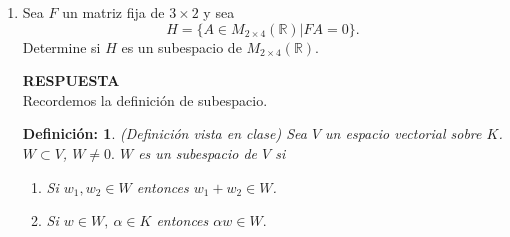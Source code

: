 \documentclass[11pt,letterpaper]{article}
\newcommand{\res}{\textbf{RESPUESTA}\\}
\newtheorem{thmd}{Definición:}
\begin{document}
\begin{enumerate}
\begin{align*}
A=\begin{pmatrix}
B & C \\
0 & E
\end{pmatrix}
\end{align*}
con $B$ y $E$ no singulares. Demuestre que $A^{-1}$ es de la forma
\begin{align*}
\begin{pmatrix}
B^{-1}& X \\
0 & E^{-1}
\end{pmatrix}
\end{align*}
y encuentre $X$. Luego, si 
\begin{align*}
A_1=\begin{pmatrix}
B & 0 \\
D & E
\end{pmatrix}
\end{align*}
y encuentre $Y$.

\res
Como ya demostramos que $A^{-1}$ es de la forma \begin{align*}
\begin{pmatrix}
B^{-1}& X \\
0 & E^{-1}
\end{pmatrix},
\end{align*}
entonces se tiene que cumplir que:
\begin{align*}
AA^{-1}:=\begin{pmatrix}
B & C \\
0 &E
\end{pmatrix}\begin{pmatrix}
B^{-1}& X \\
0 & E^{-1}
\end{pmatrix}=\begin{pmatrix}
I & 0 \\
0 & I
\end{pmatrix}\\
\end{align*}
\item Sea $F$ un matriz fija de $3\times 2$ y sea $$H=\{A\in M_{2\times 4}(\mathbb{R})|FA=0\}.$$
Determine si $H$ es un subespacio de $M_{2\times 4}(\mathbb{R})$.

\res
Recordemos la definición de subespacio.
\begin{framed}
    \begin{thmd} \label{subespacio}
    (Definición vista en clase) Sea $V$ un espacio vectorial sobre $K$. $W\subset V$, $W\neq 0.$ $W$ es un subespacio de $V$ si 
    \begin{enumerate}
    \item Si $w_1,w_2 \in W$ entonces $w_1+w_2\in W$.
    \item Si $w\in W,\ \alpha\in K$ entonces $\alpha w\in W.$
    \end{enumerate}
    \end{thmd}
\end{framed} 


\end{enumerate}
\end{document}
